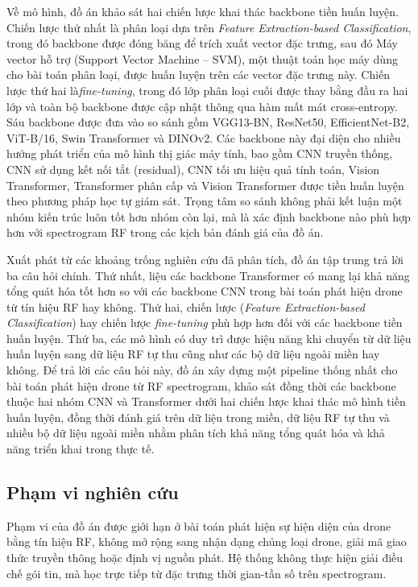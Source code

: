 \documentclass[../DoAn.tex]{subfiles}
\begin{document}
Về mô hình, đồ án khảo sát hai chiến lược khai thác backbone tiền huấn luyện. Chiến lược thứ nhất là phân loại dựa trên \textit{Feature Extraction-based Classification}, trong đó backbone được đóng băng để trích xuất vector đặc trưng, sau đó Máy vector hỗ trợ (Support Vector Machine – SVM), một thuật toán học máy dùng cho bài toán phân loại, được huấn luyện trên các vector đặc trưng này. Chiến lược thứ hai là\textit{fine-tuning}, trong đó lớp phân loại cuối được thay bằng đầu ra hai lớp và toàn bộ backbone được cập nhật thông qua hàm mất mát cross-entropy. Sáu backbone được đưa vào so sánh gồm VGG13-BN, ResNet50, EfficientNet-B2, ViT-B/16, Swin Transformer và DINOv2. Các backbone này đại diện cho nhiều hướng phát triển của mô hình thị giác máy tính, bao gồm CNN truyền thống, CNN sử dụng kết nối tắt (residual), CNN tối ưu hiệu quả tính toán, Vision Transformer, Transformer phân cấp và Vision Transformer được tiền huấn luyện theo phương pháp học tự giám sát. Trọng tâm so sánh không phải kết luận một nhóm kiến trúc luôn tốt hơn nhóm còn lại, mà là xác định backbone nào phù hợp hơn với spectrogram RF trong các kịch bản đánh giá của đồ án.

Xuất phát từ các khoảng trống nghiên cứu đã phân tích, đồ án tập trung trả lời ba câu hỏi chính. Thứ nhất, liệu các backbone Transformer có mang lại khả năng tổng quát hóa tốt hơn so với các backbone CNN trong bài toán phát hiện drone từ tín hiệu RF hay không. Thứ hai, chiến lược (\textit{Feature Extraction-based Classification}) hay chiến lược \textit{fine-tuning} phù hợp hơn đối với các backbone tiền huấn luyện. Thứ ba, các mô hình có duy trì được hiệu năng khi chuyển từ dữ liệu huấn luyện sang dữ liệu RF tự thu cũng như các bộ dữ liệu ngoài miền hay không. Để trả lời các câu hỏi này, đồ án xây dựng một pipeline thống nhất cho bài toán phát hiện drone từ RF spectrogram, khảo sát đồng thời các backbone thuộc hai nhóm CNN và Transformer dưới hai chiến lược khai thác mô hình tiền huấn luyện, đồng thời đánh giá trên dữ liệu trong miền, dữ liệu RF tự thu và nhiều bộ dữ liệu ngoài miền nhằm phân tích khả năng tổng quát hóa và khả năng triển khai trong thực tế.

\subsection{Phạm vi nghiên cứu}

Phạm vi của đồ án được giới hạn ở bài toán phát hiện sự hiện diện của drone bằng tín hiệu RF, không mở rộng sang nhận dạng chủng loại drone, giải mã giao thức truyền thông hoặc định vị nguồn phát. Hệ thống không thực hiện giải điều chế gói tin, mà học trực tiếp từ đặc trưng thời gian-tần số trên spectrogram.
\end{document}
